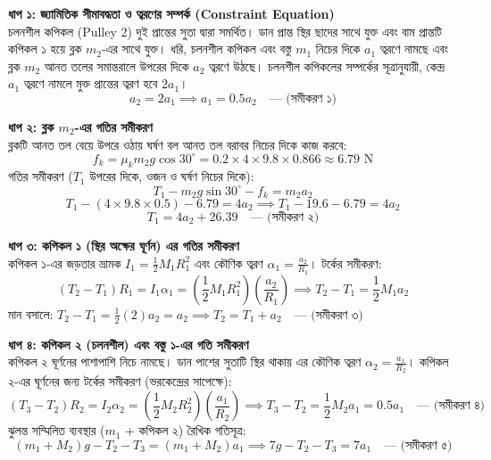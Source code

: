 \documentclass[12pt, a4paper]{article}
\begin{document}
\begin{tcolorbox}[solutionbox={সমাধান (Solution)}]
\noindent
\textbf{ধাপ ১: জ্যামিতিক সীমাবদ্ধতা ও ত্বরণের সম্পর্ক (Constraint Equation)} \\
চলনশীল কপিকল (Pulley 2) দুই প্রান্তের সুতা দ্বারা সমর্থিত। ডান প্রান্ত স্থির ছাদের সাথে যুক্ত এবং বাম প্রান্তটি কপিকল ১ হয়ে ব্লক $m_2$-এর সাথে যুক্ত। ধরি, চলনশীল কপিকল এবং বস্তু $m_1$ নিচের দিকে $a_1$ ত্বরণে নামছে এবং ব্লক $m_2$ আনত তলের সমান্তরালে উপরের দিকে $a_2$ ত্বরণে উঠছে।
চলনশীল কপিকলের সম্পর্কের সূত্রানুযায়ী, কেন্দ্র $a_1$ ত্বরণে নামলে মুক্ত প্রান্তের ত্বরণ হবে $2a_1$।
\[ a_2 = 2 a_1 \implies a_1 = 0.5 a_2 \quad \text{--- (সমীকরণ ১)} \]

\vspace{0.5em}
\noindent
\textbf{ধাপ ২: ব্লক $m_2$-এর গতির সমীকরণ} \\
ব্লকটি আনত তল বেয়ে উপরে ওঠায় ঘর্ষণ বল আনত তল বরাবর নিচের দিকে কাজ করবে:
\[ f_k = \mu_k m_2 g \cos 30^\circ = 0.2 \times 4 \times 9.8 \times 0.866 \approx 6.79\text{ N} \]
গতির সমীকরণ ($T_1$ উপরের দিকে, ওজন ও ঘর্ষণ নিচের দিকে):
\[ T_1 - m_2 g \sin 30^\circ - f_k = m_2 a_2 \]
\[ T_1 - (4 \times 9.8 \times 0.5) - 6.79 = 4 a_2 \implies T_1 - 19.6 - 6.79 = 4 a_2 \]
\[ T_1 = 4 a_2 + 26.39 \quad \text{--- (সমীকরণ ২)} \]

\vspace{0.5em}
\noindent
\textbf{ধাপ ৩: কপিকল ১ (স্থির অক্ষের ঘূর্ণন) এর গতির সমীকরণ} \\
কপিকল ১-এর জড়তার ভ্রামক $I_1 = \frac{1}{2} M_1 R_1^2$ এবং কৌণিক ত্বরণ $\alpha_1 = \frac{a_2}{R_1}$। টর্কের সমীকরণ:
\[ (T_2 - T_1) R_1 = I_1 \alpha_1 = \left(\frac{1}{2} M_1 R_1^2\right) \left(\frac{a_2}{R_1}\right) \implies T_2 - T_1 = \frac{1}{2} M_1 a_2 \]
মান বসালে: $T_2 - T_1 = \frac{1}{2}(2)a_2 = a_2 \implies T_2 = T_1 + a_2 \quad \text{--- (সমীকরণ ৩)}$

\vspace{0.5em}
\noindent
\textbf{ধাপ ৪: কপিকল ২ (চলনশীল) এবং বস্তু ১-এর গতি সমীকরণ} \\
কপিকল ২ ঘূর্ণনের পাশাপাশি নিচে নামছে। ডান পাশের সুতাটি স্থির থাকায় এর কৌণিক ত্বরণ $\alpha_2 = \frac{a_1}{R_2}$। কপিকল ২-এর ঘূর্ণনের জন্য টর্কের সমীকরণ (ভরকেন্দ্রের সাপেক্ষে):
\[ (T_3 - T_2) R_2 = I_2 \alpha_2 = \left(\frac{1}{2} M_2 R_2^2\right) \left(\frac{a_1}{R_2}\right) \implies T_3 - T_2 = \frac{1}{2} M_2 a_1 = 0.5 a_1 \quad \text{--- (সমীকরণ ৪)} \]
ঝুলন্ত সম্মিলিত ব্যবস্থার ($m_1$ + কপিকল ২) রৈখিক গতিসূত্র:
\[ (m_1 + M_2)g - T_2 - T_3 = (m_1 + M_2)a_1 \implies 7g - T_2 - T_3 = 7 a_1 \quad \text{--- (সমীকরণ ৫)} \]


\end{tcolorbox}
\end{document}

